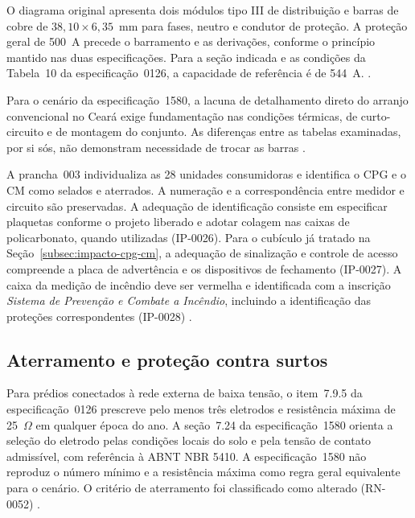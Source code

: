 O diagrama original apresenta dois módulos tipo III de distribuição e barras de cobre de \(38{,}10\times6{,}35\)~mm para fases, neutro e condutor de proteção. A proteção geral de 500~A precede o barramento e as derivações, conforme o princípio mantido nas duas especificações. Para a seção indicada e as condições da Tabela~10 da especificação~0126, a capacidade de referência é de 544~A. \cite[prancha~003]{palatiumpranchas2025}\cite[item~7.7.8.1.1 e tabela~10]{enel0126}\cite[item~7.22.6]{enel1580}.

Para o cenário da especificação~1580, a lacuna de detalhamento direto do arranjo convencional no Ceará exige fundamentação nas condições térmicas, de curto-circuito e de montagem do conjunto. As diferenças entre as tabelas examinadas, por si sós, não demonstram necessidade de trocar as barras \cite{abnt5410}\cite[itens~7.19.4 e~7.20.1 e tabelas~22, 23 e~28]{enel1580}.

A prancha~003 individualiza as 28 unidades consumidoras e identifica o CPG e o CM como selados e aterrados. A numeração e a correspondência entre medidor e circuito são preservadas. A adequação de identificação consiste em especificar plaquetas conforme o projeto liberado e adotar colagem nas caixas de policarbonato, quando utilizadas (IP-0026). Para o cubículo já tratado na Seção~\ref{subsec:impacto-cpg-cm}, a adequação de sinalização e controle de acesso compreende a placa de advertência e os dispositivos de fechamento (IP-0027). A caixa da medição de incêndio deve ser vermelha e identificada com a inscrição \emph{Sistema de Prevenção e Combate a Incêndio}, incluindo a identificação das proteções correspondentes (IP-0028) \cite[prancha~003]{palatiumpranchas2025}\cite[itens~7.11.8, 7.18.2 e~7.23.1]{enel1580}.

\subsection{Aterramento e proteção contra surtos}\label{subsec:impacto-aterramento-dps}

Para prédios conectados à rede externa de baixa tensão, o item~7.9.5 da especificação~0126 prescreve pelo menos três eletrodos e resistência máxima de 25~\(\Omega\) em qualquer época do ano. A seção~7.24 da especificação~1580 orienta a seleção do eletrodo pelas condições locais do solo e pela tensão de contato admissível, com referência à ABNT NBR 5410. A especificação~1580 não reproduz o número mínimo e a resistência máxima como regra geral equivalente para o cenário. O critério de aterramento foi classificado como alterado (RN-0052) \cite[seção~7.9]{enel0126}\cite[seção~7.24]{enel1580}.

